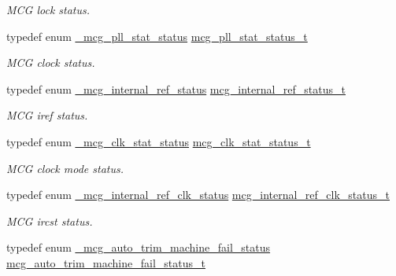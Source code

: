 \begin{DoxyCompactItemize}
\begin{DoxyCompactList}\small\item\em M\+CG lock status. \end{DoxyCompactList}\item 
typedef enum \hyperlink{group__mcg__hal_gafaa982941f2a56f98ea43547b43a88ad}{\+\_\+mcg\+\_\+pll\+\_\+stat\+\_\+status} \hyperlink{group__mcg__hal_gaa22c75fe8fda8a13d3f54483b121f777}{mcg\+\_\+pll\+\_\+stat\+\_\+status\+\_\+t}\hypertarget{group__mcg__hal_gaa22c75fe8fda8a13d3f54483b121f777}{}\label{group__mcg__hal_gaa22c75fe8fda8a13d3f54483b121f777}

\begin{DoxyCompactList}\small\item\em M\+CG clock status. \end{DoxyCompactList}\item 
typedef enum \hyperlink{group__mcg__hal_ga95436f592752a9f4f61d83d656d9719c}{\+\_\+mcg\+\_\+internal\+\_\+ref\+\_\+status} \hyperlink{group__mcg__hal_ga717c95ce4c3515e35f1d10caf3920140}{mcg\+\_\+internal\+\_\+ref\+\_\+status\+\_\+t}\hypertarget{group__mcg__hal_ga717c95ce4c3515e35f1d10caf3920140}{}\label{group__mcg__hal_ga717c95ce4c3515e35f1d10caf3920140}

\begin{DoxyCompactList}\small\item\em M\+CG iref status. \end{DoxyCompactList}\item 
typedef enum \hyperlink{group__mcg__hal_gaddcbf0f48f40da43344b0954c39a98a7}{\+\_\+mcg\+\_\+clk\+\_\+stat\+\_\+status} \hyperlink{group__mcg__hal_ga04824cd7f2a4b64ea8d7b110fcc09f99}{mcg\+\_\+clk\+\_\+stat\+\_\+status\+\_\+t}\hypertarget{group__mcg__hal_ga04824cd7f2a4b64ea8d7b110fcc09f99}{}\label{group__mcg__hal_ga04824cd7f2a4b64ea8d7b110fcc09f99}

\begin{DoxyCompactList}\small\item\em M\+CG clock mode status. \end{DoxyCompactList}\item 
typedef enum \hyperlink{group__mcg__hal_ga978a9571080887fbf525f18d23c69f16}{\+\_\+mcg\+\_\+internal\+\_\+ref\+\_\+clk\+\_\+status} \hyperlink{group__mcg__hal_gad8b2f8e2f53e360554e11506c3961a4f}{mcg\+\_\+internal\+\_\+ref\+\_\+clk\+\_\+status\+\_\+t}\hypertarget{group__mcg__hal_gad8b2f8e2f53e360554e11506c3961a4f}{}\label{group__mcg__hal_gad8b2f8e2f53e360554e11506c3961a4f}

\begin{DoxyCompactList}\small\item\em M\+CG ircst status. \end{DoxyCompactList}\item 
typedef enum \hyperlink{group__mcg__hal_ga816f934f0e92520237f2ab53bcfe39e4}{\+\_\+mcg\+\_\+auto\+\_\+trim\+\_\+machine\+\_\+fail\+\_\+status} \hyperlink{group__mcg__hal_ga9740d881d226ede1dcdd277c9686fcd2}{mcg\+\_\+auto\+\_\+trim\+\_\+machine\+\_\+fail\+\_\+status\+\_\+t}\hypertarget{group__mcg__hal_ga9740d881d226ede1dcdd277c9686fcd2}{}\label{group__mcg__hal_ga9740d881d226ede1dcdd277c9686fcd2}


\end{DoxyCompactItemize}
